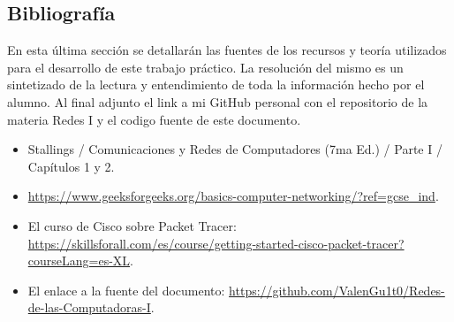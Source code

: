 \documentclass{article}
\begin{document}
\subsection{Bibliografía}
En esta última sección se detallarán las fuentes de los recursos y teoría utilizados para el desarrollo de este trabajo práctico. La resolución del mismo es un sintetizado de la lectura y entendimiento de toda la información hecho por el alumno. Al final adjunto el link a mi GitHub personal con el repositorio de la materia Redes I y el codigo fuente de este documento.
\begin{itemize}
    \item Stallings / Comunicaciones y Redes de Computadores (7ma Ed.) / Parte I / Capítulos 1 y 2.
    \item \url{https://www.geeksforgeeks.org/basics-computer-networking/?ref=gcse_ind}.
    \item El curso de Cisco sobre Packet Tracer: 
    \url{ https://skillsforall.com/es/course/getting-started-cisco-packet-tracer?courseLang=es-XL}.
    \item El enlace a la fuente del documento: \url{https://github.com/ValenGu1t0/Redes-de-las-Computadoras-I}.
\end{itemize}
\end{document}
